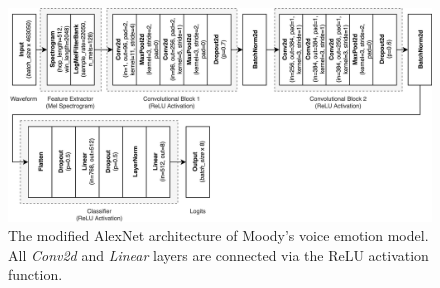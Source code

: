 \begin{figure}
    \centering
    \includegraphics[width=\textwidth]{assets/alexnet_architecture.png}
    \caption{The modified AlexNet architecture of Moody's voice emotion model. All \emph{Conv2d} and \emph{Linear} layers are connected via the ReLU activation function.}
    \label{fig:alexnet_architecture}
\end{figure}
